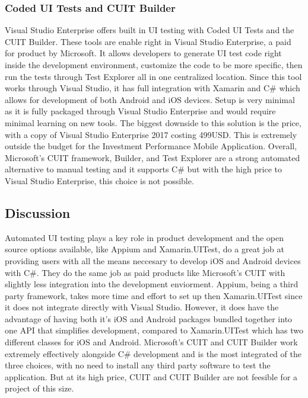 \documentclass[onecolumn, draftclsnofoot,10pt, compsoc]{IEEEtran}
\begin{document}
\begin{singlespace}
\subsubsection{Coded UI Tests and CUIT Builder}
Visual Studio Enterprise offers built in UI testing with Coded UI Tests and the CUIT Builder. These tools are enable right in Visual Studio Enterprise, a paid for product by Microsoft. It allows developers to generate UI test
code right inside the development environment, customize the code to be more specific, then run the tests through Test Explorer all in one centralized location. Since this tool works through Visual Studio, it has full
integration with Xamarin and C\# which allows for development of both Android and iOS devices. Setup is very minimal as it is fully packaged  through Visual Studio Enterprise and would require minimal learning on new tools.
The biggest downside to this solution is the price, with a copy of Visual Studio  Enterprise 2017 costing 499USD. This is extremely outside the budget for the Investment Performance Mobile Application. Overall, Microsoft's CUIT
framework, Builder, and Test Explorer are a strong automated alternative to manual testing and it supports C\# but with the high price to Visual Studio Enterprise, this choice is not possible.

\subsection{Discussion}
Automated UI testing plays a key role in product development and the open source options available, like Appium and Xamarin.UITest, do a great job at providing users with all the means neccesary to develop iOS and Android devices
with C\#. They do the same job as paid products like Microsoft's CUIT with slightly less integration into the development enviorment. Appium, being a third party framework, takes more time and effort to set up then
Xamarin.UITest since it does not integrate directly with Visual Studio. However, it does have the advantage of having both it's iOS and Android packages bundled together into one API that simplifies development, compared to
Xamarin.UITest which has two different classes for iOS and Android. Microsoft's CUIT and CUIT Builder  work extremely effectively alongside C\# development and is the most integrated of the three choices, with no need
to install any third party software to test the application. But at its high price,  CUIT and CUIT Builder are not feesible for a project of this size.


\end{singlespace}
\end{document}
